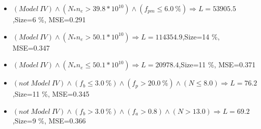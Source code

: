 \documentclass[numbered]{CSL}
\begin{document}
\begin{itemize}
\item $(Model~IV) \land (N_* n_e > 39.8 * 10^{10}) \land (f_{pm} \leq 6.0~\%) \Rightarrow L = 53905.5$,\hfill Size=6 \%, MSE=0.291
\item $(Model~IV) \land (N_* n_e > 50.1 * 10^{10}) \Rightarrow L = 114354.9$,\hfill Size=14 \%, MSE=0.347
\item $(Model~IV) \land (N_* n_e \leq 50.1 * 10^{10}) \Rightarrow L = 20978.4$,\hfill Size=11 \%, MSE=0.371
\item $(not~Model~IV) \land (f_b \leq 3.0~\%) \land (f_p > 20.0~\%) \land (N \leq 8.0) \Rightarrow L = 76.2$,\hfill Size=11 \%, MSE=0.345
\item $(not~Model~IV) \land (f_b > 3.0~\%) \land (f_a > 0.8) \land (N > 13.0) \Rightarrow L = 69.2$,\hfill Size=9 \%, MSE=0.366
\end{itemize}
\end{document}
